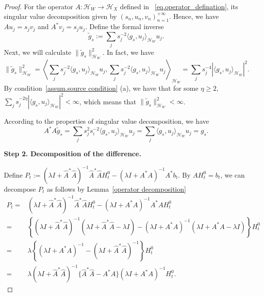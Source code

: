\documentclass[
  12pt]{article}
\def\to{\rightarrow}
\def\wt{\widetilde}
\def\cH{\mathcal{H}}
\begin{document}
\begin{proof}
For the operator $A:\cH_W\to\cH_X$ defined in ~\eqref{eq.operator_defination}, its singular value decomposition given by $(s_n,u_n,v_n)_{n=1}^{+\infty}$. Hence, we have $Au_j=s_jv_j$ and $A^*v_j=s_ju_j$. Define the formal inverse
\begin{equation}
\label{eq.g_s_define}
    \wt g_s:=\sum_j s_j^{-2}\langle g_s,u_j\rangle_{\mathcal{H}_W} u_j.
\end{equation}
Next, we will calculate $\| \wt{g}_s\|_{\mathcal{H}_W}^2$. In fact, we have
\begin{equation}\label{eq.g_s_wt}
    \| \wt{g}_s\|_{\mathcal{H}_W}^2=\left\langle \sum_j{s_j^{-2}}\langle g_s,u_j \rangle_{\mathcal{H}_W} u_j,\sum_j{s_j^{-2}}\langle g_s,u_j \rangle_{\mathcal{H}_W}  u_j \right\rangle_{\mathcal{H}_W} = \sum_j{s_j^{-4}|\langle g_s,u_j \rangle_{\mathcal{H}_W}  |^2}.
\end{equation}
By condition~\ref{assum.source condition} (a), we have that for some $\eta \geq 2$, $\sum_j{s_j^{-2\eta}|\langle g_s,u_j\rangle_{\cH_W} |^2}<\infty$, which means that $\| \wt{g}_s\|_{\mathcal{H}_W}^2<\infty$. 

According to the properties of singular value decomposition, we have
\begin{equation}
\label{eq.g_s_wt_g_s}
A^*A\wt{g}_s=\sum_j s_j^2 s_i^{-2} \langle g_s,u_j \rangle_{\mathcal{H}_W}  u_j =\sum_j{\langle g_s,u_j \rangle_{\mathcal{H}_W}  u_j}=g_s.
\end{equation}



\noindent\textbf{Step 2. Decomposition of the difference.}

Define $P_t:=(\lambda I+\widehat{A}^*\widehat{A})^{-1}\widehat{A}^*\widehat{A}H^0_t-(\lambda I+A^*A)^{-1}A^*b_t$.  By $AH^0_t = b_t$, we can decompose $P_t$ as follows by Lemma~\ref{operator decomposition}
\begin{equation}\label{eq. P_t}
    \begin{aligned}
        P_t = &(\lambda I+\widehat{A}^*\widehat{A})^{-1}\widehat{A}^*\widehat{A}H^0_t-(\lambda I+A^*A)^{-1}A^*AH^0_t\\
	= &\left\{ (\lambda I+\widehat{A}^*\widehat{A})^{-1}(\lambda I+\widehat{A}^*\widehat{A}-\lambda I)-(\lambda I+A^*A)^{-1}(\lambda I+A^*A-\lambda I) \right\} H^0_t\\
	= &\lambda \left\{ (\lambda I+A^*A)^{-1}-(\lambda I+\widehat{A}^*\widehat{A})^{-1} \right\} H^0_t\\
	= &\lambda (\lambda I+\widehat{A}^*\widehat{A})^{-1}\{ \widehat{A}^*\widehat{A}-A^*A \} (\lambda I+A^*A)^{-1}H^0_t.
    \end{aligned}
\end{equation}


\end{proof}
\end{document}
